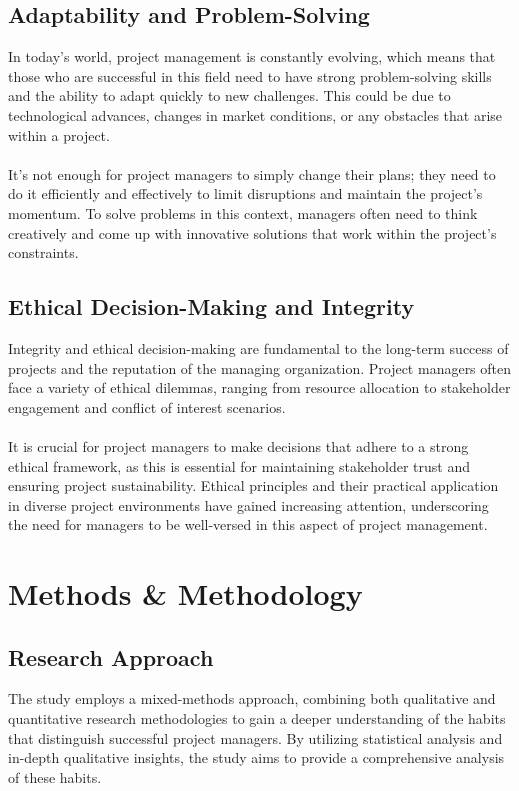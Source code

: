\documentclass{article}
\begin{document}
\subsection{Adaptability and Problem-Solving}
In today's world, project management is constantly evolving, which means that those who are successful in this field need to have strong problem-solving skills and the ability to adapt quickly to new challenges. This could be due to technological advances, changes in market conditions, or any obstacles that arise within a project. \\\\It's not enough for project managers to simply change their plans; they need to do it efficiently and effectively to limit disruptions and maintain the project's momentum. To solve problems in this context, managers often need to think creatively and come up with innovative solutions that work within the project's constraints.\cite{Project_Management_Leadership}


\subsection{Ethical Decision-Making and Integrity}
Integrity and ethical decision-making are fundamental to the long-term success of projects and the reputation of the managing organization. Project managers often face a variety of ethical dilemmas, ranging from resource allocation to stakeholder engagement and conflict of interest scenarios. \\\\It is crucial for project managers to make decisions that adhere to a strong ethical framework, as this is essential for maintaining stakeholder trust and ensuring project sustainability. Ethical principles and their practical application in diverse project environments have gained increasing attention, underscoring the need for managers to be well-versed in this aspect of project management\cite{Project_Management_Techniques}.


\newpage
\section{Methods \& Methodology}
\subsection{Research Approach}
The study employs a mixed-methods approach, combining both qualitative and quantitative research methodologies to gain a deeper understanding of the habits that distinguish successful project managers. By utilizing statistical analysis and in-depth qualitative insights, the study aims to provide a comprehensive analysis of these habits.
\end{document}
